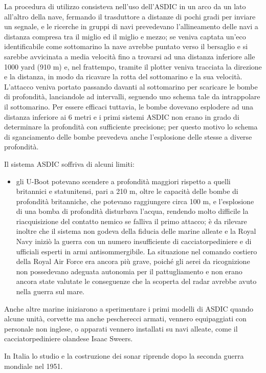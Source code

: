 La procedura di utilizzo consisteva nell'uso dell'ASDIC in un arco da un lato all'altro della nave, fermando il trasduttore a distanze di pochi gradi per inviare un segnale, e le ricerche in gruppi di navi prevedevano l'allineamento delle navi a distanza compresa tra il miglio ed il miglio e mezzo; se veniva captata un'eco identificabile come sottomarino la nave avrebbe puntato verso il bersaglio e si sarebbe avvicinata a media velocità fino a trovarsi ad una distanza inferiore alle 1000 yard (910 m) e, nel frattempo, tramite il plotter veniva tracciata la direzione e la distanza, in modo da ricavare la rotta del sottomarino e la sua velocità. L'attacco veniva portato passando davanti al sottomarino per scaricare le bombe di profondità, lanciandole ad intervalli, seguendo uno schema tale da intrappolare il sottomarino. Per essere efficaci tuttavia, le bombe dovevano esplodere ad una distanza inferiore ai 6 metri e i primi sistemi ASDIC non erano in grado di determinare la profondità con sufficiente precisione; per questo motivo lo schema di sganciamento delle bombe prevedeva anche l'esplosione delle stesse a diverse profondità.

Il sistema ASDIC soffriva di alcuni limiti:
\begin{itemize}
\item gli U-Boot potevano scendere a profondità maggiori rispetto a quelli britannici e statunitensi, pari a 210 m, oltre le capacità delle bombe di profondità britanniche, che potevano raggiungere circa 100 m, e l'esplosione di una bomba di profondità disturbava l'acqua, rendendo molto difficile la riacquisizione del contatto nemico se falliva il primo attacco; è da rilevare inoltre che il sistema non godeva della fiducia delle marine alleate e la Royal Navy iniziò la guerra con un numero insufficiente di cacciatorpediniere e di ufficiali esperti in armi antisommergibile. La situazione nel comando costiero della Royal Air Force era ancora più grave, poiché gli aerei da ricognizione non possedevano adeguata autonomia per il pattugliamento e non erano ancora state valutate le conseguenze che la scoperta del radar avrebbe avuto nella guerra sul mare.
\end{itemize}

Anche altre marine iniziarono a sperimentare i primi modelli di ASDIC quando alcune unità, corvette ma anche pescherecci armati, vennero equipaggiati con personale non inglese, o apparati vennero installati su navi alleate, come il cacciatorpediniere olandese Isaac Sweers.

In Italia lo studio e la costruzione dei sonar riprende dopo la seconda guerra mondiale nel 1951.

